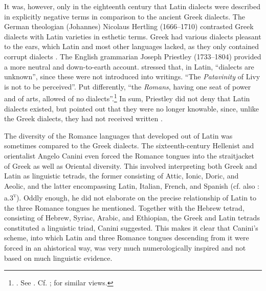 It was, however, only in the eighteenth century that Latin dialects were described in explicitly negative terms in comparison to the ancient Greek dialects. The German theologian (Johannes) Nicolaus Hertling (1666–1710) contrasted Greek dialects with Latin varieties in esthetic terms. Greek had various dialects pleasant to the ears, which Latin and most other languages lacked, as they only contained corrupt dialects \citep[73]{Hertling1708}. The English grammarian Joseph Priestley (1733–1804) provided a more neutral and down-to-earth account. \citet[138]{Priestley1762} stressed that, in Latin, “dialects are unknown”, since these were not introduced into writings. “The \textit{Patavinity} of Livy is not to be perceived”. Put differently, “the \textit{Romans}, having one seat of power and of arts, allowed of no dialects”.\footnote{\citet[280]{Priestley1762}. See \citet[52]{Amsler1993}. Cf. \citet[49]{Galiani1779}; \citet[203--205]{Ries1786} for similar views.} In sum, Priestley did not deny that Latin dialects existed, but pointed out that they were no longer knowable, since, unlike the Greek dialects, they had not received written .

The diversity of the Romance languages that developed out of Latin was sometimes compared to the Greek dialects. The sixteenth-century Hellenist and orientalist Angelo Canini even forced the Romance tongues into the straitjacket of Greek as well as Oriental diversity. This involved \citet[\textsc{a}.iii\textsc{\textsuperscript{r}}]{Canini1554} interpreting both Greek and Latin as linguistic tetrads, the former consisting of Attic, Ionic, Doric, and Aeolic, and the latter encompassing Latin, Italian, French, and Spanish (cf. also \citealt{Canini1555}: a.3\textsc{\textsuperscript{v}}). Oddly enough, he did not elaborate on the precise relationship of Latin to the three Romance tongues he mentioned. Together with the Hebrew tetrad, consisting of Hebrew, Syriac, Arabic, and Ethiopian, the Greek and Latin tetrads constituted a linguistic triad, Canini suggested. This makes it clear that Canini’s scheme, into which Latin and three Romance tongues descending from it were forced in an ahistorical way, was very much numerologically inspired and not based on much linguistic evidence.

